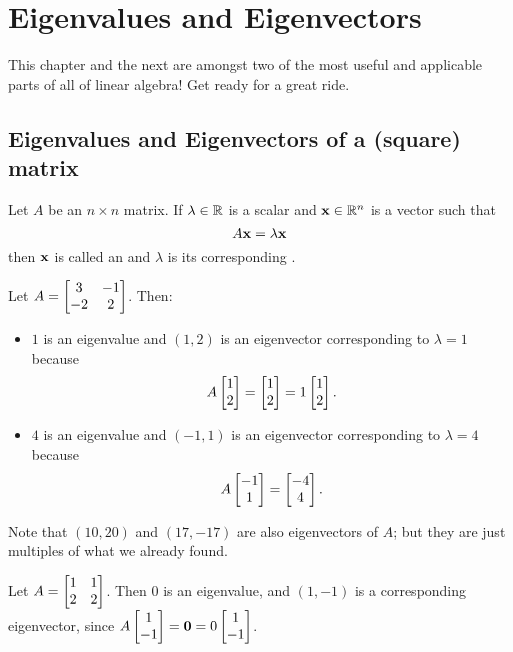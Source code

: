 \chapter{Eigenvalues and Eigenvectors}
\label{chapter:22Eigen}
This chapter and the next are amongst two of the most useful and applicable parts of all of linear algebra! Get ready for a great ride.

\section{Eigenvalues and Eigenvectors of a (square) matrix}
\begin{definition}\label{section:eigen}
Let $A$ be an $n\times n$ matrix.  
If $\lambda\in \mathbb{R}$ is a scalar and $\mathbf{x} \in \mathbb{R}^n$ is a  vector 
such that
$$
A \mathbf{x} = \lambda \mathbf{x}
$$
then $\mathbf{x}$ is called an  and $\lambda$ is its
corresponding .
\end{definition}

\begin{myexample}
Let $A = \left[ \begin{matrix} 3 & -1 \\ -2 & 2 \end{matrix} \right]$.  Then:
\begin{itemize}
\item $1$ is an eigenvalue and $(1,2)$ is an eigenvector corresponding to $\lambda = 1$ because $$A\left[ \begin{matrix} 1\\2 \end{matrix} \right] = \left[ \begin{matrix} 1\\2 \end{matrix} \right]=1\left[ \begin{matrix} 1\\2 \end{matrix} \right].$$
\item $4$ is an eigenvalue and $(-1,1)$ is an eigenvector corresponding to $\lambda = 4$ because $$A\left[ \begin{matrix} -1\\1 \end{matrix} \right] = \left[ \begin{matrix} -4\\4 \end{matrix} \right].$$
\end{itemize}
Note that $(10,20)$ and $(17,-17)$ are also eigenvectors of $A$; but
they are just multiples of what we already found.
\end{myexample}

\begin{myexample}
Let $A = \left[ \begin{matrix} 1 & 1\\ 2 & 2 \end{matrix} \right]$.  Then 
$0$ is an eigenvalue, and $(1,-1)$ is a corresponding eigenvector,
since $A\left[ \begin{matrix} 1\\-1 \end{matrix} \right] = \mathbf{0} = 0\left[ \begin{matrix} 1\\-1 \end{matrix} \right]$.
\end{myexample}


